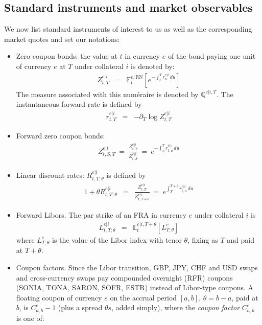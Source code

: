 \documentclass[11pt,english]{amsart}
\newcommand{\RN}{\mathrm{RN}}
\newcommand{\EE}{\mathbb{E}}
\newcommand{\QQ}{\mathbb{Q}}
\theoremstyle{definition}
\begin{document}
\subsection{Standard instruments and market observables}\label{sec:market_observables_list}

We now list standard instruments of interest to us as well as the corresponding market quotes and set our notations:
\begin{itemize}
\item Zero coupon bonds: the value at $t$ in currency $e$ of the bond paying one unit of currency $e$ at $T$ under collateral $i$ is denoted by: 
\begin{eqnarray}
  Z^{e|i}_{t,T} &=& \EE^{e,\RN}_t \left[ e^{-\int_t^T r^{e|i}_u \,du} \right]
\end{eqnarray} 
The measure associated with this num\'{e}raire is denoted by $\QQ^{e|i,T}$. The instantaneous forward rate is defined by 
\begin{eqnarray}
  r^{e|i}_{t,T} &=& - \partial_T \log Z^{e|i}_{t,T}  
\end{eqnarray} 
\item Forward zero coupon bonds: 
\begin{eqnarray}
	Z^{e|i}_{t,S,T} ~=~ \frac{Z^{e|i}_{t,T}}{Z^{e|i}_{t,S}} ~=~ e^{-\int_S^T r^{e|i}_{t,u}\,du}
\end{eqnarray} 
\item Linear discount rates: $R^{e|i}_{t,T;\theta}$ is defined by 
\begin{eqnarray}
  1 + \theta R^{e|i}_{t,T;\theta} &=& \frac{Z^{e|i}_{t,T}}{Z^{e|i}_{t,T+\theta}} 
  ~=~ e^{\int_T^{T+\theta} r^{e|i}_{t,u}\,du}
\end{eqnarray} 
\item Forward Libors. The par strike of an FRA in currency $e$ under collateral $i$ is
\begin{eqnarray}
  	L^{e|i}_{t,T;\theta}	&=& \EE^{e|i,T+\theta}_t \left[L^e_{T;\theta}\right] 
\label{eq:forward_libor}
\end{eqnarray} 
where $L^e_{T;\theta}$ is the value of the Libor index with tenor $\theta$, fixing as $T$ and paid at $T+\theta$.
\item Coupon factors. Since the Libor transition, GBP, JPY, CHF and USD swaps and cross-currency swaps pay compounded overnight (RFR) coupons (SONIA, TONA, SARON, SOFR, ESTR) instead of Libor-type coupons. A floating coupon of currency $e$ on the accrual period $[a,b]$, $\theta = b-a$, paid at $b$, is $C^e_{a,b} - 1$ (plus a spread $\theta s$, added simply), where the \emph{coupon factor} $C^e_{a,b}$ is one of:

\end{itemize}
\end{document}

